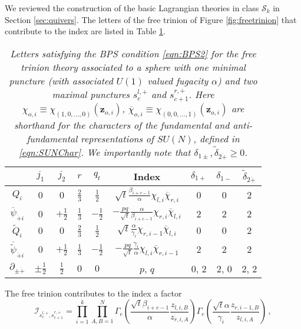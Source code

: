 \documentclass[main.tex]{subfiles}
\begin{document}
We reviewed the construction of the basic Lagrangian theories in class $\mathcal{S}_k$ in Section \ref{sec:quivers}. The letters of the free trinion of Figure \ref{fig:freetrinion} that contribute to the index are listed in Table \ref{tab:lettersft}.
\begin{table}
\centering
\begin{tabular}{|c||c|c|c|c|c|c|c|c|} 
\hline
 &  $j_1$ & $j_2$ & $r$ & $q_t$& Index&$\delta_{1+}$&$\delta_{1-}$&$\widetilde{\delta}_{2\dot+}$\\ 
 \hline\hline
  $Q_i$ & $0$ & $0$ & $\frac{2}{3}$ &$\frac{1}{2}$&$\sqrt{t}\frac{\beta_{i+c-1}}{\alpha}\chi_{l,i}\overline{\chi}_{r,i}$&$0$&$0$&$2$\\[2pt]\hline
 $\overline{\psi}_{\dot+i}$ & $0$ & $+\frac{1}{2}$ & $\frac{1}{3}$ & $-\frac{1}{2}$& $-\frac{pq}{\sqrt{t}}\frac{\alpha}{\beta_{i+c-1}}\chi_{r,i}\overline{\chi}_{l,i}$&$2$&$2$&$2$\\ [2pt]
 \hline
\hline
  $\widetilde{Q}_i$ & $0$ & $0$ & $\frac{2}{3}$ &$\frac{1}{2}$ &$\sqrt{t}\frac{\alpha}{\gamma_i}\chi_{r,i-1}\overline{\chi}_{l,i}$&$0$&$0$&$2$\\[2pt] 
 \hline
 $\overline{\widetilde{\psi}}_{\dot+i}$ & $0$ & $+\frac{1}{2}$ & $\frac{1}{3}$ &$-\frac{1}{2}$ & $-\frac{pq}{\sqrt{t}}\frac{\gamma_i}{\alpha}\chi_{l,i}\overline{\chi}_{r,i-1}$&$2$&$2$&$2$\\ [2pt]
 \hline
\hline
    $\partial_{\pm\dot+}$ &  $\pm\frac{1}{2}$ & $\frac{1}{2}$ & $0$ &$0$&  $p$, $q$&$0$, $2$&$2$, $0$&$2$, $2$\\[2pt] 
 \hline
\end{tabular}
\caption{\textit{Letters satisfying the BPS condition \eqref{eqn:BPS2} for the free trinion theory associated to a sphere with one minimal puncture (with associated $U(1)$ valued fugacity $\alpha$) and two maximal punctures $s_{c}^{l,+}$ and $s_{c+1}^{r,+}$. Here $\chi_{o,i}\equiv\chi_{(1,0,\dots,0)}(\mathbf{z}_{o,i})$, $\overline{\chi}_{o,i}\equiv\chi_{(0,0,\dots,1)}(\mathbf{z}_{o,i})$ are shorthand for the characters of the fundamental and anti-fundamental representations of $SU(N)$, defined in \eqref{eqn:SUNChar}. We importantly note that $\delta_{1\pm},\widetilde{\delta}_{2\dot+}\geq0$.}}
\label{tab:lettersft}
\end{table}
The free trinion contributes to the index a factor
\begin{equation}\label{eqn:ftindex}
\mathcal{I}_{s_{c}^{l,+},s_{c+1}^{r,+}}=\prod_{i=1}^k\prod_{A,B=1}^N\Gamma_e\left(\frac{\sqrt{t}\beta_{i+c-1}}{\alpha}\frac{z_{l,i,B}}{z_{r,i,A}}\right)\Gamma_e\left(\frac{\sqrt{t}\alpha}{\gamma_i}\frac{z_{r,i-1,B}}{z_{l,i,A}}\right)\,,
\end{equation}
\end{document}
